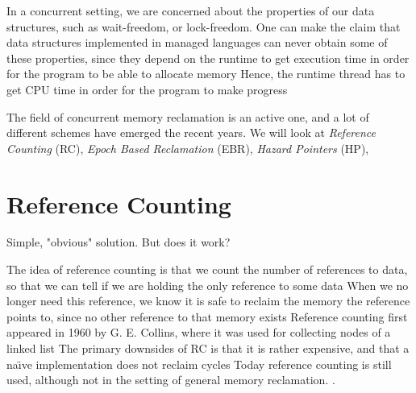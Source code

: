 \documentclass[b5paper]{report}
\begin{document}
In a concurrent setting, we are concerned about the properties of our data
structures,  such as wait-freedom, or lock-freedom.
 One can make the claim that data structures
implemented in managed languages can never obtain some of these properties,
since they depend on the runtime to get execution time in order for the program
to be able to allocate memory Hence, the runtime thread has to get CPU time
in order for the program to make progress 

The field of concurrent memory reclamation is an active one, and a lot of
different schemes have emerged the recent years. We will look at
\emph{Reference Counting} (RC),
\emph{Epoch Based Reclamation} (EBR),
\emph{Hazard Pointers} (HP),




\section{Reference Counting}
Simple, "obvious" solution. But does it work?

 The idea of reference counting is that we count the number of references
to data, so that we can tell if we are holding the only reference to some
data When we no longer need this reference, we know it is safe to reclaim the
memory the reference points to, since no other reference to that memory
exists Reference counting first appeared in 1960 by G. E.
Collins\cite{collins1960method}, where it was used for collecting nodes of a
linked list The primary downsides of RC is that it is rather expensive, and
that a na\"\i{}ve implementation does not reclaim cycles Today reference
counting is still used, although not in the setting of general memory
reclamation.  .

%
\end{document}
